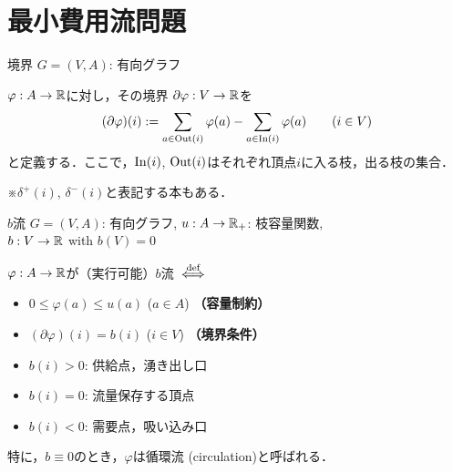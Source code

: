 \documentclass[14pt,aspectratio=169,xcolor=dvipsnames,table,onlytextwidth,dvipdfmx]{beamer}
\begin{document}
\section{最小費用流問題}
\begin{frame}{境界}
    $G = (V, A)$: 有向グラフ 

    \begin{definition}
        $\varphi: A \to \mathbb{R}$に対し，その\alert{境界} $\partial \varphi: V \to \mathbb{R}$を
        \[
            (\partial\varphi)(i) := \sum_{a \in \operatorname{Out}(i)} \varphi(a) - \sum_{a \in \operatorname{In}(i)} \varphi(a)  \qquad (i \in V)
        \]
        と定義する．ここで，$\operatorname{In}(i)$, $\operatorname{Out}(i)$はそれぞれ頂点$i$に入る枝，出る枝の集合．

        {\hfill\footnotesize ※$\delta^+(i)$, $\delta^-(i)$と表記する本もある．}
    \end{definition}
\end{frame}

\begin{frame}{$b$流}
    $G = (V, A)$: 有向グラフ, $u: A \to \mathbb{R}_+$: 枝容量関数, \\
    \alert{$b: V \to \mathbb{R}$ with $b(V) = 0$}

    \begin{definition}[$b$流]
        $\varphi: A \to \mathbb{R}$が\alert{（実行可能）$b$流} $\overset{\text{def}}{\iff}$
        \begin{itemize}
            \item $0 \leq \varphi(a) \leq u(a)$ \qquad ($a \in A$) \hfill \textbf{（容量制約）} 
            \item $(\partial\varphi)(i) = b(i)$ \qquad ($i \in V$) \hfill \textbf{（境界条件）}
        \end{itemize}
    \end{definition}

    \begin{itemize}
        \item $b(i) > 0$: 供給点，湧き出し口
        \item $b(i) = 0$: 流量保存する頂点
        \item $b(i) < 0$: 需要点，吸い込み口
    \end{itemize}

    特に，$b \equiv 0$のとき，$\varphi$は\alert{循環流 (circulation)}と呼ばれる．
\end{frame}
\end{document}
